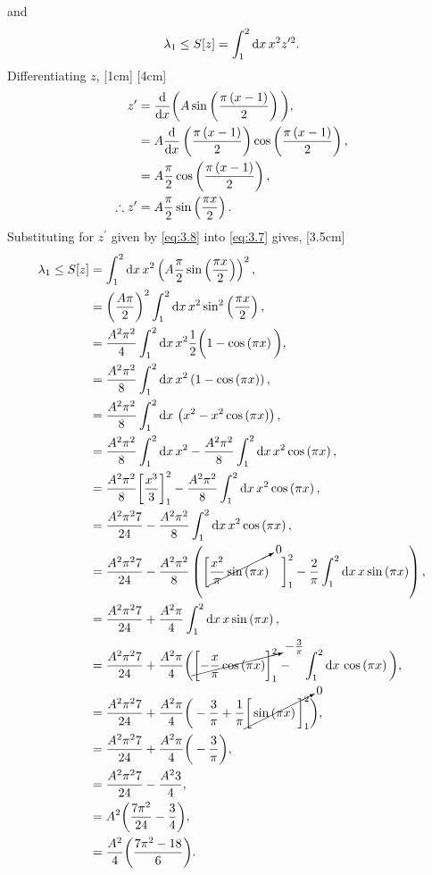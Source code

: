 and
\begin{align}
\label{eq:3.7}
\lambda_1 \leq S[z] = \int_{1}^{2}\mathrm{d} x\, x^2 z^{\prime 2}.
\end{align}
Differentiating $z$,
[1cm]
[4cm]
\begin{align}
	z^\prime &= \frac{\mathrm{d}}{\mathrm{d}x}\bigg(A\sin\left(\frac{\pi\left(x-1\right)}{2}\right)\bigg),\nonumber\\
	&= A\frac{\mathrm{d}}{\mathrm{d}x}\left(\frac{\pi\left(x-1\right)}{2}\right)\cos\left(\frac{\pi\left(x-1\right)}{2}\right),\nonumber\\
	&= A\frac{\pi}{2}\cos\left(\frac{\pi\left(x-1\right)}{2}\right),\nonumber\\
	\label{eq:3.8}
	\therefore z^\prime&= A\frac{\pi}{2}\sin\left(\frac{\pi x}{2}\right).
\end{align}
Substituting for $z^\prime$ given by \eqref{eq:3.8} into \eqref{eq:3.7} gives,
[3.5cm]
\begin{align}
	\lambda_1 \leq S[z] &= \int_{1}^{2}\mathrm{d} x\, x^2 \left(A\frac{\pi}{2}\sin\left(\frac{\pi x}{2}\right)\right)^2,\nonumber\\
	&=\left(\frac{A\pi}{2}\right)^2\int_{1}^{2}\mathrm{d} x\, x^2 \sin^2\left(\frac{\pi x}{2}\right),\nonumber\\
	&=\frac{A^2\pi^2}{4}\int_{1}^{2}\mathrm{d} x\, x^2 \frac{1}{2}\bigg(1-\cos\left(\pi x\right)\bigg),\nonumber\\
	&= \frac{A^2\pi^2}{8}\int_{1}^{2}\mathrm{d} x\, x^2 \left(1-\cos\left(\pi x\right)\right),\nonumber\\
	&= \frac{A^2\pi^2}{8}\int_{1}^{2}\mathrm{d} x\, \left(x^2 - x^2\cos\left(\pi x\right)\right),\nonumber\\
	&= \frac{A^2\pi^2}{8}\int_{1}^{2}\mathrm{d} x\, x^2 - \frac{A^2\pi^2}{8}\int_{1}^{2}\mathrm{d} x\, x^2\cos\left(\pi x\right),\nonumber\\
	&= \frac{A^2\pi^2}{8}\bigg[\frac{x^3}{3}\bigg]_1^2 - \frac{A^2\pi^2}{8}\int_{1}^{2}\mathrm{d} x\, x^2\cos\left(\pi x\right),\nonumber\\
	&= \frac{A^2\pi^2 7}{24} - \frac{A^2\pi^2}{8}\int_{1}^{2}\mathrm{d} x\, x^2\cos\left(\pi x\right),\nonumber\\
	&= \frac{A^2\pi^2 7}{24} - \frac{A^2\pi^2}{8}\left(\bigg[\cancelto{0}{\frac{x^2}{\pi}\sin\left(\pi x\right)}\quad\bigg]_1^2 - \frac{2}{\pi}\int_{1}^{2}\mathrm{d} x\, x\sin\left(\pi x\right)\right),\nonumber\\
	&= \frac{A^2\pi^2 7}{24} + \frac{A^2\pi}{4}\int_{1}^{2}\mathrm{d} x\, x\sin\left(\pi x\right),\nonumber\\
	&= \frac{A^2\pi^2 7}{24} + \frac{A^2\pi}{4}\bigg(\cancelto{-\frac{3}{\pi}}{\bigg[{-\frac{x}{\pi}\cos\left(\pi x\right)}\bigg]_1^2} - \quad\int_{1}^{2}\mathrm{d} x\,\cos\left(\pi x\right)\bigg),\nonumber\\
	&= \frac{A^2\pi^2 7}{24} + \frac{A^2\pi}{4}\bigg(-\frac{3}{\pi} + \frac{1}{\pi}\cancelto{0}{\bigg[\sin\left(\pi x\right)\bigg]_1^2}\bigg),\nonumber\\
	&= \frac{A^2\pi^2 7}{24} + \frac{A^2\pi}{4}\bigg(-\frac{3}{\pi}\bigg),\nonumber\\
	&= \frac{A^2\pi^2 7}{24} - \frac{A^2 3}{4},\nonumber\\
	&= A^2\bigg(\frac{ 7\pi^2}{24} - \frac{3}{4}\bigg),\nonumber\\
	\label{eq:3.9}
	&= \frac{A^2}{4}\bigg(\frac{ 7\pi^2 -18}{6}\bigg).
\end{align}
